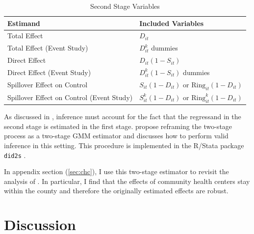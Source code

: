 \documentclass[11pt]{article}
\begin{document}
\begin{table}[!tb]
    \caption{Second Stage Variables}
    \label{tab:second_stage}

    \centering
    \begin{threeparttable}
        \begin{tabular}{@{} *{2}{l} @{}}
            \toprule
            \textbf{Estimand} & \textbf{Included Variables} \\

            \midrule
            Total Effect & $D_{it}$ \\
            Total Effect (Event Study) & $D_{it}^k$ dummies \\
            Direct Effect & $D_{it}(1 - S_{it})$ \\
            Direct Effect (Event Study) & $D_{it}^k(1 - S_{it})$ dummies \\
            Spillover Effect on Control & $S_{it}(1 - D_{it})$ or $\text{Ring}_{it}(1-D_{it})$ \\
            Spillover Effect on Control (Event Study) & $S_{it}^k(1 - D_{it})$ or $\text{Ring}_{it}^k(1-D_{it})$ \\
            \bottomrule
        \end{tabular}
    \end{threeparttable}

\end{table}

As discussed in \citet{Gardner_2021}, inference must account for the fact that the regressand in the second stage is estimated in the first stage. \citet{Gardner_2021} propose reframing the two-stage process as a two-stage GMM estimator and discusses how to perform valid inference in this setting. This procedure is implemented in the R/Stata package \texttt{did2s} \citep{did2s}. 

In appendix section (\ref{sec:chc}), I use this two-stage estimator to revisit the analysis of \citet{Bailey_Goodman_Bacon_2015}. In particular, I find that the effects of community health centers stay within the county and therefore the originally estimated effects are robust. 

\section{Discussion}
\label{sec:conclusion}
\end{document}
